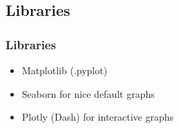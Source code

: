 \subsection{Libraries}

\begin{frame}\frametitle{Libraries}
   \begin{itemize}
      \item Matplotlib (.pyplot)
      \item Seaborn for nice default graphs
      \item Plotly (Dash) for interactive graphs
   \end{itemize}
\end{frame}



